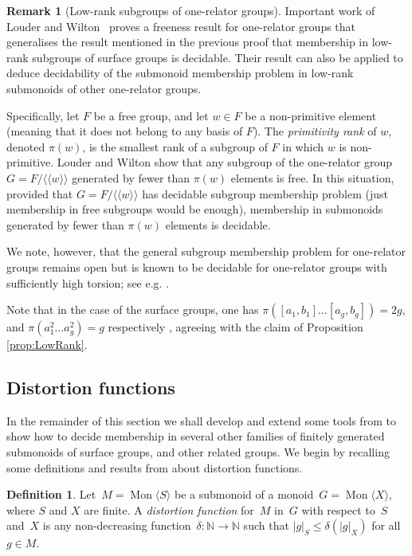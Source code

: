 \documentclass[11pt]{amsart}
\newcommand{\Mgen}[1]{\operatorname{Mon}\bigl\langle #1 \bigr\rangle}
\newcommand{\N}{\mathbb{N}}
\theoremstyle{plain}
\theoremstyle{definition}
\newtheorem{mydef}[theorem]{Definition}
\newtheorem{remark}[theorem]{Remark}
\begin{document}
\begin{remark}[Low-rank subgroups of one-relator groups]\label{rmk:prank}
Important work of Louder and Wilton~\cite{louder2022negative} proves a freeness result for one-relator groups that 
generalises the result mentioned in the previous proof that membership in low-rank subgroups of surface groups is decidable.  
Their result can also be applied to deduce decidability of the submonoid membership problem in low-rank submonoids of other one-relator groups.

Specifically, let $F$ be a free group, and let $w \in F$ be a non-primitive element (meaning that it does not belong to any basis of $F$). The \emph{primitivity rank} of $w$, denoted $\pi(w)$, is the smallest rank of a subgroup of $F$ in which $w$ is non-primitive. Louder and Wilton show that any subgroup of the one-relator group $G = F / \langle\langle w \rangle\rangle$ generated by fewer than $\pi(w)$ elements is free.
In this situation, provided that $G = F / \langle\langle w \rangle\rangle$ has decidable subgroup membership problem (just membership in free subgroups would be enough), membership in submonoids generated by fewer than $\pi(w)$ elements is decidable.

We note, however, that the general subgroup membership problem for one-relator groups remains open but is known to be decidable for one-relator groups with sufficiently high torsion; see e.g. \cite{mccammond2005coherence}. 

Note that in the case of the surface groups, one has $\pi([a_1,b_1]\ldots[a_g,b_g]) = 2g$, and $\pi(a_1^2 \ldots a_g^2) = g$ respectively \cite{puder2014primitive}, agreeing with the claim of Proposition \ref{prop:LowRank}.
\end{remark}


\subsection{Distortion functions}\label{sec: Distortions}

In the remainder of this section we shall develop and extend some tools from \cite{margolis2005distortion} to show how to decide membership in several other families of finitely generated submonoids of surface groups, and other related groups. We begin by recalling some definitions and results from \cite{margolis2005distortion} about distortion functions.





\begin{mydef}
Let~$M = \Mgen{S}$ be a submonoid of a monoid~$G = \Mgen{X}$, where $S$ and $X$ are finite. 
A \emph{distortion function} for~$M$ in~$G$ with respect to~$S$ and~$X$ is any non-decreasing function~$\delta \colon \N \rightarrow \N$ such that
$
|g|_S \leq \delta(|g|_X)
$
for all~$g \in M$.
\end{mydef}
\end{document}
